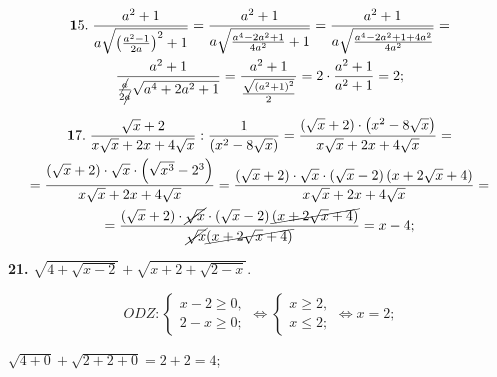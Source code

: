 \begin{multline*}
{\mathbf 15.}\;
\frac{a^2 + 1}{a\sqrt{\left(\frac{a^2 - 1}{2a}\right)^2 + 1}} =
\frac{a^2 + 1}{a\sqrt{\frac{a^4 - 2a^2 + 1}{4a^2} + 1}} =
\frac{a^2 + 1}{a\sqrt{\frac{a^4 - 2a^2 + 1 + 4a^2}{4a^2}}} =\\
\frac{a^2 + 1}{\frac{\cancel{a}}{2\cancel{a}}\sqrt{a^4 + 2a^2 + 1}} =
\frac{a^2 + 1}{\frac{\sqrt{\left(a^2 + 1\right)^2}}{2}} =
2 \cdot \frac{a^2 + 1}{a^2 + 1} = 2;
\end{multline*}

\begin{multline*}
{\mathbf 17.}\;
\frac{\sqrt{x} + 2}{x\sqrt{x} + 2x + 4\sqrt{x}} : \frac{1}{\left(x^2 - 8\sqrt{x}\right)} =
\frac{\left(\sqrt{x} + 2\right) \cdot \left(x^2 - 8\sqrt{x}\right)}{x\sqrt{x} + 2x + 4\sqrt{x}} =\\
= \frac{\left(\sqrt{x} + 2\right) \cdot \sqrt{x} \cdot \left(\sqrt{x^3} - 2^3\right)}{x\sqrt{x} + 2x + 4\sqrt{x}} =
\frac{\left(\sqrt{x} + 2\right) \cdot \sqrt{x} \cdot \left(\sqrt{x} - 2\right)\left(x + 2\sqrt{x} + 4\right)}{x\sqrt{x} + 2x + 4\sqrt{x}} =\\
= \frac{\left(\sqrt{x} + 2\right) \cdot \cancel{\sqrt{x}} \cdot \left(\sqrt{x} - 2\right)\cancel{\left(x + 2\sqrt{x} + 4\right)}}{\cancel{\sqrt{x}}\cancel{\left(x + 2\sqrt{x} + 4\right)}} =
x - 4;
\end{multline*}

\textbf{21.} $\sqrt{4 + \sqrt{x - 2}} + \sqrt{x + 2 + \sqrt{2 - x}}$.

$$
ODZ: 
\begin{cases}
x - 2 \ge 0,\\
2 - x \ge 0;
\end{cases}
\Longleftrightarrow
\begin{cases}
x\ge 2,\\
x \le 2;
\end{cases}
\Longleftrightarrow
x = 2;
$$

$\sqrt{4 + 0} + \sqrt{2 + 2 + 0} = 2 + 2 = 4$;